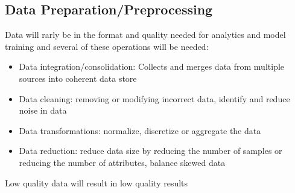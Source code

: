  \subsection{Data Preparation/Preprocessing}
 Data will rarly be in the format and quality needed for analytics and model training and several of these operations will be needed:
 \begin{itemize}
    \item Data integration/consolidation: Collects and merges data from multiple sources into coherent data store 
    \item Data cleaning: removing or modifying incorrect data, identify and reduce noise in data
    \item Data transformations: normalize, discretize or aggregate the data
    \item Data reduction: reduce data size by reducing the number of samples or reducing the number of attributes, balance skewed data
 \end{itemize}
 Low quality data will result in low quality results

